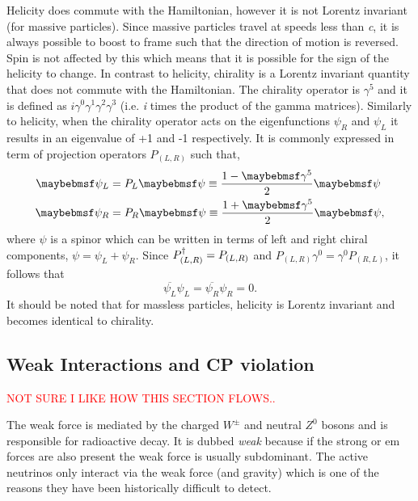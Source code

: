 Helicity does commute with the Hamiltonian, however it is not Lorentz invariant (for massive particles). Since massive particles travel at speeds less than \textit{c}, it is always possible to boost to frame such that the direction of motion is reversed. Spin is not affected by this which means that it is possible for the sign of the helicity to change. In contrast to helicity, chirality is a Lorentz invariant quantity that does not commute with the Hamiltonian. The chirality operator is $\gamma^5$ and it is defined as $i\gamma^0\gamma^1\gamma^2\gamma^3$ (i.e. \textit{i} times the product of the gamma matrices). Similarly to helicity, when the chirality operator acts on the eigenfunctions $\psi_R$ and $\psi_L$ it results in an eigenvalue of +1 and -1 respectively. It is commonly expressed in term of projection operators $P_{(L, R)}$ such that,
\begin{equation}
\begin{split}
    \psi_L &= P_L\psi \isdefined \frac{1-\gamma^5}{2}\psi \\
    \psi_R &= P_R\psi \isdefined \frac{1+\gamma^5}{2}\psi,
\end{split}
\end{equation}
where $\psi$ is a spinor which can be written in terms of left and right chiral components, $\psi = \psi_L + \psi_R$.
Since $P_{(L,R)}^\dagger = P_{(L,R)}$ and $P_{(L,R)}\gamma^0 = \gamma^0P_{(R,L)}$, it follows that
\begin{equation}\label{eqn:chiral identity}
    \overline{\psi_L}\psi_L = \overline{\psi_R}\psi_R = 0.
\end{equation}
It should be noted that for massless particles, helicity is Lorentz invariant and becomes identical to chirality.  
\cite{Fundamentals_of_Neutrino_Physics_and_Astrophysics}

\subsection{Weak Interactions and CP violation}
\textcolor{red}{NOT SURE I LIKE HOW THIS SECTION FLOWS..}

The weak force is mediated by the charged $W^\pm$ and neutral $Z^0$ bosons and is responsible for radioactive decay. It is dubbed \textit{weak} because if the strong or \gls{em} forces are also present the weak force is usually subdominant. The active neutrinos only interact via the weak force (and gravity) which is one of the reasons they have been historically difficult to detect. 

